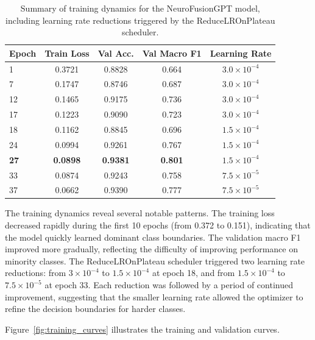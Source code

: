 \documentclass[12pt,letterpaper]{report}
\begin{document}
\begin{table}[H]
\centering
\caption[Training summary]{Summary of training dynamics for the NeuroFusionGPT model, including learning rate reductions triggered by the ReduceLROnPlateau scheduler.}
\label{tab:training_summary}
\begin{tabular}{lcccc}
\toprule
\textbf{Epoch} & \textbf{Train Loss} & \textbf{Val Acc.} & \textbf{Val Macro F1} & \textbf{Learning Rate} \\
\midrule
1 & 0.3721 & 0.8828 & 0.664 & $3.0 \times 10^{-4}$ \\
7 & 0.1747 & 0.8746 & 0.687 & $3.0 \times 10^{-4}$ \\
12 & 0.1465 & 0.9175 & 0.736 & $3.0 \times 10^{-4}$ \\
17 & 0.1223 & 0.9090 & 0.723 & $3.0 \times 10^{-4}$ \\
18 & 0.1162 & 0.8845 & 0.696 & $1.5 \times 10^{-4}$ \\
24 & 0.0994 & 0.9261 & 0.767 & $1.5 \times 10^{-4}$ \\
\textbf{27} & \textbf{0.0898} & \textbf{0.9381} & \textbf{0.801} & $1.5 \times 10^{-4}$ \\
33 & 0.0874 & 0.9243 & 0.758 & $7.5 \times 10^{-5}$ \\
37 & 0.0662 & 0.9390 & 0.777 & $7.5 \times 10^{-5}$ \\
\bottomrule
\end{tabular}
\end{table}

The training dynamics reveal several notable patterns. The training loss decreased rapidly during the first 10 epochs (from 0.372 to 0.151), indicating that the model quickly learned dominant class boundaries. The validation macro F1 improved more gradually, reflecting the difficulty of improving performance on minority classes. The ReduceLROnPlateau scheduler triggered two learning rate reductions: from $3 \times 10^{-4}$ to $1.5 \times 10^{-4}$ at epoch 18, and from $1.5 \times 10^{-4}$ to $7.5 \times 10^{-5}$ at epoch 33. Each reduction was followed by a period of continued improvement, suggesting that the smaller learning rate allowed the optimizer to refine the decision boundaries for harder classes.

Figure~\ref{fig:training_curves} illustrates the training and validation curves.
\end{document}

